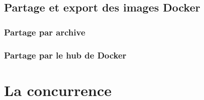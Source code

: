 \documentclass{beamer}
\begin{document}
    \subsection{Partage et export des images Docker}
    \begin{frame}
    \end{frame}

    \subsubsection{Partage par archive}
    \begin{frame}
    \end{frame}

    \subsubsection{Partage par le hub de Docker}
    \begin{frame}
    \end{frame}


    \section{La concurrence}
\end{document}
